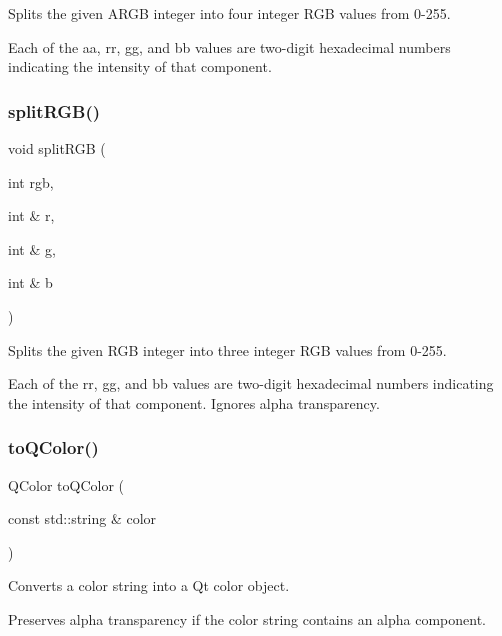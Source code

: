 Splits the given A\+R\+GB integer into four integer R\+GB values from 0-\/255. 

Each of the {\ttfamily aa}, {\ttfamily rr}, {\ttfamily gg}, and {\ttfamily bb} values are two-\/digit hexadecimal numbers indicating the intensity of that component. \mbox{\label{classGColor_a32dea18e982a160b7b1ce8b4e881c0f9}} 
\subsubsection{\texorpdfstring{split\+R\+G\+B()}{splitRGB()}}
{\footnotesize\ttfamily void split\+R\+GB (\begin{DoxyParamCaption}\item[{int}]{rgb,  }\item[{int \&}]{r,  }\item[{int \&}]{g,  }\item[{int \&}]{b }\end{DoxyParamCaption})\hspace{0.3cm}{\ttfamily [static]}}



Splits the given R\+GB integer into three integer R\+GB values from 0-\/255. 

Each of the {\ttfamily rr}, {\ttfamily gg}, and {\ttfamily bb} values are two-\/digit hexadecimal numbers indicating the intensity of that component. Ignores alpha transparency. \mbox{\label{classGColor_a23f62da01b905b62266904a01cfb3745}} 
\subsubsection{\texorpdfstring{to\+Q\+Color()}{toQColor()}}
{\footnotesize\ttfamily Q\+Color to\+Q\+Color (\begin{DoxyParamCaption}\item[{const std\+::string \&}]{color }\end{DoxyParamCaption})\hspace{0.3cm}{\ttfamily [static]}}



Converts a color string into a Qt color object. 

Preserves alpha transparency if the color string contains an alpha component. \mbox{\label{classGColor_a979586dd4aaf299d42cf19619ee89280}} 

